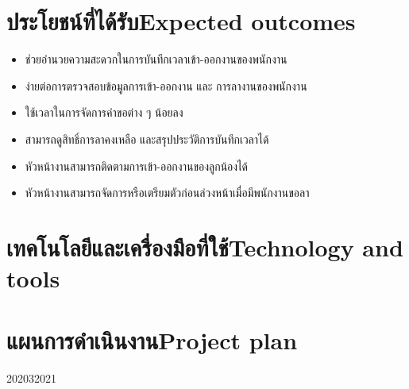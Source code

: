 \section{\ifcpe ประโยชน์ที่ได้รับ\else Expected outcomes\fi}
\begin{itemize}
    \item ช่วยอำนวยความสะดวกในการบันทึกเวลาเข้า-ออกงานของพนักงาน
    \item ง่ายต่อการตรวจสอบข้อมูลการเข้า-ออกงาน และ การลางานของพนักงาน
    \item ใช้เวลาในการจัดการคำขอต่าง ๆ น้อยลง
    \item สามารถดูสิทธิ์การลาคงเหลือ และสรุปประวัติการบันทึกเวลาได้
    \item หัวหน้างานสามารถติดตามการเข้า-ออกงานของลูกน้องได้
    \item หัวหน้างานสามารถจัดการหรือเตรียมตัวก่อนล่วงหน้าเมื่อมีพนักงานขอลา
\end{itemize}
\section{\ifcpe เทคโนโลยีและเครื่องมือที่ใช้\else Technology and tools\fi}
\section{\ifcpe แผนการดำเนินงาน\else Project plan\fi}
\begin{plan}{7}{2020}{3}{2021}
\end{plan}

